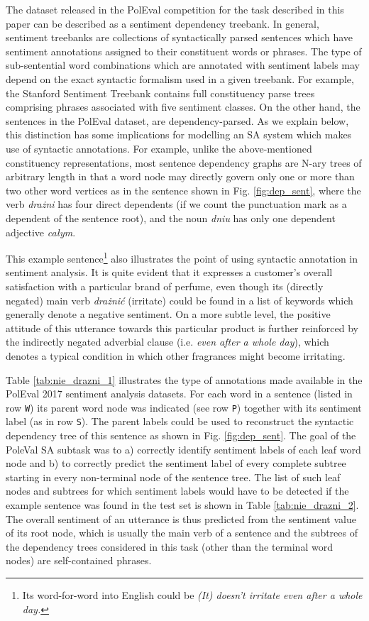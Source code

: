 \documentclass[10pt, a4paper]{article}
\begin{document}
The dataset released in the PolEval competition for the task described in this paper can be described as a sentiment dependency treebank. In general, sentiment treebanks are collections of syntactically parsed sentences which have sentiment annotations assigned to their constituent words or phrases. The type of sub-sentential word combinations which are annotated with  sentiment labels may depend on the exact syntactic formalism used in a given treebank. For example, the Stanford Sentiment Treebank \cite{socher2013recursive} contains full constituency parse trees comprising phrases associated with five sentiment classes. On the other hand, the sentences in the PolEval dataset, are dependency-parsed. As we explain below, this distinction has some implications for modelling an SA system which makes use of syntactic annotations. For example, unlike the above-mentioned constituency representations, most sentence dependency graphs are N-ary trees of arbitrary length in that a word node may directly govern only one or more than two other word vertices as in the sentence shown in Fig. \ref{fig:dep_sent}, where the verb \textit{drażni} has four direct dependents (if we count the punctuation mark as a dependent of the sentence root), and the noun \textit{dniu} has only one dependent adjective \textit{całym}. 
\par This example sentence\footnote{Its word-for-word into English could be \textit{(It) doesn't irritate even after a whole day.}} also illustrates the point of using syntactic annotation in sentiment analysis. It is quite evident that it expresses a customer's overall satisfaction with a particular brand of perfume, even though its (directly negated) main verb \textit{drażnić} (irritate) could be found in a list of keywords which generally denote a negative sentiment. On a more subtle level, the positive attitude of this utterance towards this particular product is further reinforced by the indirectly negated adverbial clause (i.e. \textit{even after a whole day}), which denotes a typical condition in which other fragrances might become irritating.
\par Table \ref{tab:nie_drazni_1} illustrates the type of annotations made available in the PolEval 2017 sentiment analysis datasets. For each word in a sentence (listed in row \texttt{W}) its parent word node was indicated (see row \texttt{P}) together with its sentiment label (as in row \texttt{S}). The parent labels could be used to reconstruct the syntactic dependency tree of this sentence as shown in Fig. \ref{fig:dep_sent}. The goal of the PoleVal SA subtask was to  a) correctly identify sentiment labels of each leaf word node and b) to correctly predict the sentiment label of every complete subtree starting in every non-terminal node of the sentence tree. The list of such leaf nodes and subtrees for which sentiment labels would have to be detected if the example sentence was found in the test set is shown in Table \ref{tab:nie_drazni_2}. The overall sentiment of an utterance is thus predicted from the sentiment value of its root node, which is usually the main verb of a sentence and the subtrees of the dependency trees considered in this task (other than the terminal word nodes) are self-contained phrases. 
\end{document}
